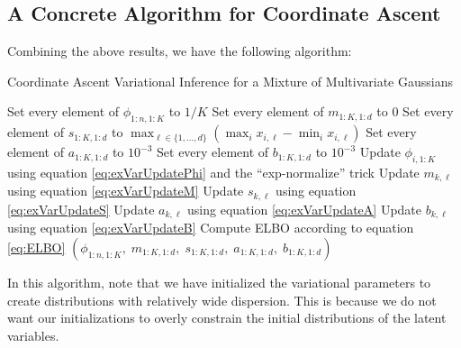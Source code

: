 \documentclass[11pt]{article}
\begin{document}
\needspace{0.25\textheight}
\subsection{A Concrete Algorithm for Coordinate Ascent}

Combining the above results, we have the following algorithm:

\begin{algorithm}[!ht]
\caption{Coordinate Ascent Variational Inference for a Mixture of Multivariate Gaussians}
\begin{algorithmic}
    \State Set every element of $\phi_{1:n,1:K}$ to $1/K$
    \State Set every element of $m_{1:K,1:d}$ to $0$
    \State Set every element of $s_{1:K,1:d}$ to $\max_{\ell \in \{1, \ldots, d\}} (\max_i x_{i,\ell} - \min_i x_{i,\ell})$
    \State Set every element of $a_{1:K,1:d}$ to $10^{-3}$
    \State Set every element of $b_{1:K,1:d}$ to $10^{-3}$
            \State Update $\phi_{i,1:K}$ using equation \eqref{eq:exVarUpdatePhi} and the ``exp-normalize'' trick
        \EndFor
                \State Update $m_{k,\ell}$ using equation \eqref{eq:exVarUpdateM}
                \State Update $s_{k,\ell}$ using equation \eqref{eq:exVarUpdateS}
                \State Update $a_{k,\ell}$ using equation \eqref{eq:exVarUpdateA}
                \State Update $b_{k,\ell}$ using equation \eqref{eq:exVarUpdateB}
            \EndFor
        \EndFor
        \State Compute ELBO according to equation \eqref{eq:ELBO}
    \EndWhile
    \State \Return $(\phi_{1:n,1:K}, \;
                     m_{1:K,1:d}, \;
                     s_{1:K,1:d}, \;
                     a_{1:K,1:d}, \;
                     b_{1:K,1:d})$
\EndFunction
\end{algorithmic}
\end{algorithm}

In this algorithm, note that we have initialized the variational parameters to create distributions with relatively wide dispersion.
This is because we do not want our initializations to overly constrain the initial distributions of the latent variables.





\end{document}
